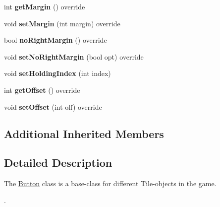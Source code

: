 \begin{DoxyCompactItemize}
\item 
\hypertarget{class_student_1_1_button_ab4f0b6f623621def47400729724e94e5}{int {\bfseries get\-Margin} () override}\label{class_student_1_1_button_ab4f0b6f623621def47400729724e94e5}

\item 
\hypertarget{class_student_1_1_button_a306b3ebc900d9fbff4226e169f288775}{void {\bfseries set\-Margin} (int margin) override}\label{class_student_1_1_button_a306b3ebc900d9fbff4226e169f288775}

\item 
\hypertarget{class_student_1_1_button_a9667950ebdbb536d416f396699aed59f}{bool {\bfseries no\-Right\-Margin} () override}\label{class_student_1_1_button_a9667950ebdbb536d416f396699aed59f}

\item 
\hypertarget{class_student_1_1_button_a9d838b8a285233b2f2f7540534d6cdc4}{void {\bfseries set\-No\-Right\-Margin} (bool opt) override}\label{class_student_1_1_button_a9d838b8a285233b2f2f7540534d6cdc4}

\item 
\hypertarget{class_student_1_1_button_a2a67b4fc207bdce4e7a65aca7f749a2b}{void {\bfseries set\-Holding\-Index} (int index)}\label{class_student_1_1_button_a2a67b4fc207bdce4e7a65aca7f749a2b}

\item 
\hypertarget{class_student_1_1_button_a66287c42462378fa165f4fd3ace2e923}{int {\bfseries get\-Offset} () override}\label{class_student_1_1_button_a66287c42462378fa165f4fd3ace2e923}

\item 
\hypertarget{class_student_1_1_button_aaba7f6b6cc4d98bb13f0c78976a18817}{void {\bfseries set\-Offset} (int off) override}\label{class_student_1_1_button_aaba7f6b6cc4d98bb13f0c78976a18817}

\end{DoxyCompactItemize}
\subsection*{Additional Inherited Members}


\subsection{Detailed Description}
The \hyperlink{class_student_1_1_button}{Button} class is a base-\/class for different Tile-\/objects in the game. \par
. 

